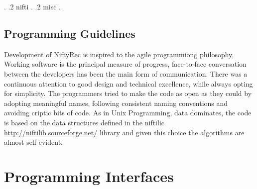 \documentclass[12pt,a4paper]{report}
\begin{document}
{{\begin{minipage}[t]{7cm}
                  \end{minipage}}. 
.2 nifti          . 
.2 misc           . 
}



\subsection{Programming Guidelines}
Development of NiftyRec is inspired to the agile programmiong philosophy, Working software is the principal 
measure of progress, face-to-face conversation between the developers has been the main form of communication. 
There was a continuous attention to good design and technical excellence, while always opting for 
simplicity. The programmers tried to make the code as open as they could by adopting meaningful names, following consistent naming 
conventions and avoiding criptic bits of code. 
As in Unix Programming, data dominates, the code is based on the data structures defined in the niftilic \url{http://niftilib.sourceforge.net/} 
library and given this choice the algorithms are almost self-evident.



\section{Programming Interfaces}
\end{document}
